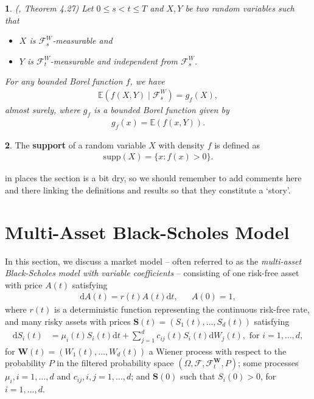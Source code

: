 \documentclass[english]{article}
\newcommand{\comment}[1]{\color{blue}#1\color{black}}
\numberwithin{equation}{section}
\numberwithin{figure}{section}
\theoremstyle{bolddescit}
\newtheorem{theorem}{\protect\theoremname}[section]
\theoremstyle{definition}
\newtheorem{definition}[theorem]{\protect\definitionname}
\theoremstyle{definition}
\theoremstyle{plain}
\theoremstyle{plain}
\theoremstyle{bolddesc}
\theoremstyle{plain}
\theoremstyle{remark}
\providecommand{\definitionname}{Definition}
\providecommand{\theoremname}{Theorem}
\begin{document}
\begin{theorem}\label{thm:cond-exp-measurable-independent}
  (\cite{kopp_probability_2013}, Theorem 4.27)
  Let $0 \le s < t \le T$ and $X, Y$ be two random variables such that
  \begin{itemize}
    \item $X$ is $\mathcal{F}^W_s$-measurable and
    \item $Y$ is $\mathcal{F}^W_t$-measurable and independent from $\mathcal{F}^W_s$.
  \end{itemize}
  For any bounded Borel function $f$, we have
  \begin{align*}
    \mathbb{E}(f(X,Y) \mid \mathcal{F}^W_s) = g_f(X),
  \end{align*}
  almost surely, where $g_f$ is a bounded Borel function given by
  \begin{align*}
    g_f(x) = \mathbb{E}(f(x,Y)).
  \end{align*}
\end{theorem}

\begin{definition}
  The \textbf{support} of a random variable $X$ with density $f$ is defined as
  \begin{align*}
    \mathrm{supp}(X) = \{x : f(x) > 0\}.
  \end{align*}
\end{definition}
\comment{in places the section is a bit dry, so we should remember to add comments here and there linking the definitions and results so that they constitute a `story'.}
\section{Multi-Asset Black-Scholes Model}

In this section, we discuss a market model -- often referred to as the \textit{multi-asset Black-Scholes model with variable coefficients} -- consisting of one risk-free asset with price $A(t)$ satisfying
\begin{align}\label{eq:multi-bs-eq-risk-free}
  \mathrm{d}A(t) = r(t) A(t) \mathrm{d}t, && A(0) = 1,
\end{align}
where $r(t)$ is a deterministic function representing the continuous risk-free rate, and many risky assets with prices $\mathbf{S}(t) = (S_1(t), \ldots, S_d(t))$ satisfying
\begin{align}
  \mathrm{d}S_i(t) &= \mu_i(t) S_i(t) \mathrm{d}t + \sum_{j=1}^{d} c_{ij}(t) S_i(t) \mathrm{d}W_j(t), \text{ for } i = 1,\ldots,d,\label{eq:multi-bs-eq}
\end{align}
for $\mathbf{W}(t) = (W_1(t), \ldots, W_d(t))$ a Wiener process with respect to the probability $P$ in the filtered probability space $(\Omega, \mathcal{F}, \mathcal{F}^\mathbf{W}_t, P)$; some processes $\mu_i, i=1,\ldots,d$ and $c_{ij}, i,j=1,\ldots,d$; and $\mathbf{S}(0)$ such that $S_i(0) > 0$, for $i=1,\ldots,d$.
\end{document}
